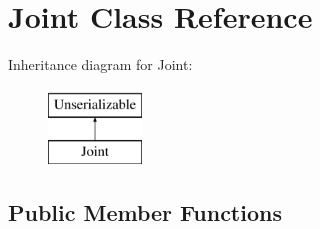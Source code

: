 \hypertarget{class_joint}{\section{\-Joint \-Class \-Reference}
\label{class_joint}
}
\-Inheritance diagram for \-Joint\-:\begin{figure}[H]
\begin{center}
\leavevmode
\includegraphics[height=2.000000cm]{class_joint}
\end{center}
\end{figure}
\subsection*{\-Public \-Member \-Functions}
